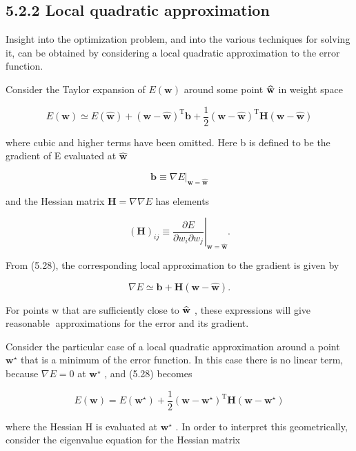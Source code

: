 \documentclass[
  10
]{article}
\begin{document}
\subsection{5.2.2 Local quadratic
approximation}\label{local-quadratic-approximation}

Insight into the optimization problem, and into the various techniques
for solving it, can be obtained by considering a local quadratic
approximation to the error function.

Consider the Taylor expansion of \(E ( \mathbf { w } )\) around some
point \(\widehat { \bf w }\) in weight space

\[
E (\mathbf {w}) \simeq E (\widehat {\mathbf {w}}) + (\mathbf {w} - \widehat {\mathbf {w}}) ^ {\mathrm{T}} \mathbf {b} + \frac {1}{2} (\mathbf {w} - \widehat {\mathbf {w}}) ^ {\mathrm{T}} \mathbf {H} (\mathbf {w} - \widehat {\mathbf {w}})\tag{5.28}
\]

where cubic and higher terms have been omitted. Here b is defined to be
the gradient of E evaluated at \(\widehat { \mathbf { w } }\)

\[
\mathbf {b} \equiv \left. \nabla E \right| _ {\mathbf {w} = \widehat {\mathbf {w}}}\tag{5.29}
\]

and the Hessian matrix \(\mathbf { H } = \nabla \nabla E\) has elements

\[
(\mathbf {H}) _ {i j} \equiv \left. \frac {\partial E}{\partial w _ {i} \partial w _ {j}} \right| _ {\mathbf {w} = \widehat {\mathbf {w}}}.\tag{5.30}
\]

From (5.28), the corresponding local approximation to the gradient is
given by

\[
\nabla E \simeq \mathbf {b} + \mathbf {H} (\mathbf {w} - \widehat {\mathbf {w}}).\tag{5.31}
\]

For points w that are sufficiently close to \(\widehat { \bf w }\) ,
these expressions will give reasonable approximations for the error and
its gradient.

Consider the particular case of a local quadratic approximation around a
point \(\mathbf { w } ^ { \star }\) that is a minimum of the error
function. In this case there is no linear term, because \(\nabla E = 0\)
at \(\mathbf { w } ^ { \star }\) , and (5.28) becomes

\[
E (\mathbf {w}) = E (\mathbf {w} ^ {\star}) + \frac {1}{2} (\mathbf {w} - \mathbf {w} ^ {\star}) ^ {\mathrm{T}} \mathbf {H} (\mathbf {w} - \mathbf {w} ^ {\star})\tag{5.32}
\]

where the Hessian H is evaluated at \(\mathbf { w } ^ { \star }\) . In
order to interpret this geometrically, consider the eigenvalue equation
for the Hessian matrix
\end{document}
